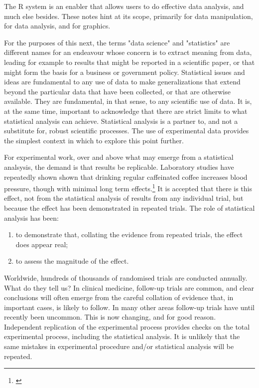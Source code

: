 The R system is an enabler that allows users to do effective
data analysis, and much else besides.  These notes hint at
its scope, primarily for data manipulation, for data analysis,
and for graphics. 

For the purposes of this next, the terms "data science" and
"statistics" are different names for an endeavour whose concern
is to extract meaning from data, leading for example to results
that might be reported in a scientific paper, or that might form
the basis for a business or government policy.  Statistical
issues and ideas are fundamental to any use of data to make
generalizations that extend beyond the particular data that
have been collected, or that are otherwise available.  They are
fundamental, in that sense, to any scientific use of data.
It is, at the same time, important to acknowledge that there
are strict limits to what statistical analysis can achieve.
Statistical analysis is a partner to, and not a substitute
for, robust scientific processes.  The use of experimental data
provides the simplest context in which to explore this point
further.

For experimental work, over and above what may emerge from a
statistical analsysis, the demand is that results be replicable.
Laboratory studies have repeatedly shown shown that drinking
regular caffeinated coffee increases blood pressure, though
with minimal long term effects.\footnote{\citet{green_kirby_suls_1996}
}  It is accepted that there is
this effect, not from the statistical analysis of results from
any individual trial, but because the effect has been demonstrated
in repeated trials.  The role of statistical analysis has been:
\begin{enumerate}
\tightlist
\item to demonstrate that, collating the evidence from repeated
trials, the effect does appear real; 
\item to assess the magnitude of the effect.
\end{enumerate}

Worldwide, hundreds of thousands of randomised trials are
conducted annually.  What do they tell us?  In clinical medicine,
follow-up trials are common, and clear conclusions will often
emerge from the careful collation of evidence that, in important
cases, is likely to follow.  In many other areas follow-up trials
have until recently been uncommon. This is now changing, and for
good reason.  Independent replication of the experimental process
provides checks on the total experimental process, including the
statistical analysis.  It is unlikely that the same mistakes in
experimental procedure and/or statistical analysis will be repeated.

